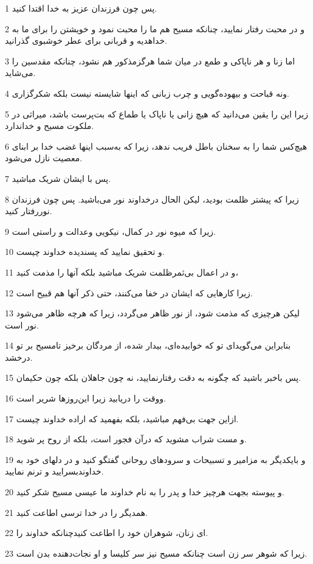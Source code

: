 \par 1 پس چون فرزندان عزیز به خدا اقتدا کنید.
\par 2 و در محبت رفتار نمایید، چنانکه مسیح هم ما را محبت نمود و خویشتن را برای ما به خداهدیه و قربانی برای عطر خوشبوی گذرانید.
\par 3 اما زنا و هر ناپاکی و طمع در میان شما هرگزمذکور هم نشود، چنانکه مقدسین را می‌شاید.
\par 4 ونه قباحت و بیهوده‌گویی و چرب زبانی که اینها شایسته نیست بلکه شکرگزاری.
\par 5 زیرا این را یقین می‌دانید که هیچ زانی یا ناپاک یا طماع که بت‌پرست باشد، میراثی در ملکوت مسیح و خداندارد.
\par 6 هیچ‌کس شما را به سخنان باطل فریب ندهد، زیرا که به‌سبب اینها غضب خدا بر ابنای معصیت نازل می‌شود.
\par 7 پس با ایشان شریک مباشید.
\par 8 زیرا که پیشتر ظلمت بودید، لیکن الحال درخداوند نور می‌باشید. پس چون فرزندان نوررفتار کنید.
\par 9 زیرا که میوه نور در کمال، نیکویی وعدالت و راستی است.
\par 10 و تحقیق نمایید که پسندیده خداوند چیست.
\par 11 و در اعمال بی‌ثمرظلمت شریک مباشید بلکه آنها را مذمت کنید،
\par 12 زیرا کارهایی که ایشان در خفا می‌کنند، حتی ذکر آنها هم قبیح است.
\par 13 لیکن هرچیزی که مذمت شود، از نور ظاهر می‌گردد، زیرا که هرچه ظاهر می‌شود نور است.
\par 14 بنابراین می‌گوید‌ای تو که خوابیده‌ای، بیدار شده، از مردگان برخیز تامسیح بر تو درخشد.
\par 15 پس باخبر باشید که چگونه به دقت رفتارنمایید، نه چون جاهلان بلکه چون حکیمان.
\par 16 ووقت را دریابید زیرا این‌روزها شریر است.
\par 17 ازاین جهت بی‌فهم مباشید، بلکه بفهمید که اراده خداوند چیست.
\par 18 و مست شراب مشوید که درآن فجور است، بلکه از روح پر شوید.
\par 19 و بایکدیگر به مزامیر و تسبیحات و سرودهای روحانی گفتگو کنید و در دلهای خود به خداوندبسرایید و ترنم نمایید.
\par 20 و پیوسته بجهت هرچیز خدا و پدر را به نام خداوند ما عیسی مسیح شکر کنید.
\par 21 همدیگر را در خدا ترسی اطاعت کنید.
\par 22 ‌ای زنان، شوهران خود را اطاعت کنیدچنانکه خداوند را.
\par 23 زیرا که شوهر سر زن است چنانکه مسیح نیز سر کلیسا و او نجات‌دهنده بدن است.
